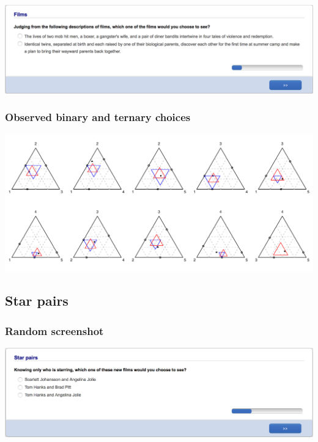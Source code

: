 \documentclass[11pt,letter]{article}
\begin{document}
\includegraphics[width=15cm]{Population_study_design/screenshot_Films.png}

\subsubsection*{Observed binary and ternary choices}

\includegraphics[width=15cm]{./Population_study_data/Simplexes/Films.pdf}

\pagebreak

\subsection{Star pairs}



\subsubsection*{Random screenshot}

\includegraphics[width=15cm]{Population_study_design/screenshot_Star_Pairs.png}
\end{document}
